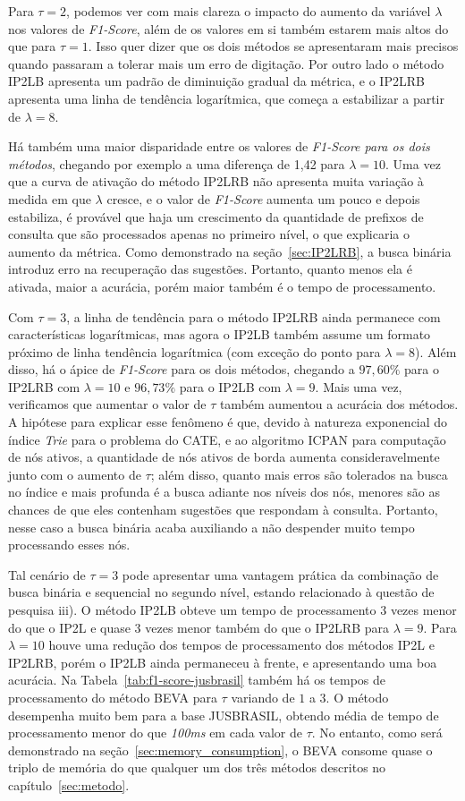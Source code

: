 Para $\tau=2$, podemos ver com mais clareza o impacto do aumento da variável $\lambda$ nos valores de \textit{F1-Score}, além de os valores em si também estarem mais altos do que para $\tau=1$. Isso quer dizer que os dois métodos se apresentaram mais precisos quando passaram a tolerar mais um erro de digitação. Por outro lado o método IP2LB apresenta um padrão de diminuição gradual da métrica, e o IP2LRB apresenta uma linha de tendência logarítmica, que começa a estabilizar a partir de $\lambda=8$.

Há também uma maior disparidade entre os valores de \textit{F1-Score para os dois métodos}, chegando por exemplo a uma diferença de 1,42 para $\lambda=10$. Uma vez que a curva de ativação do método IP2LRB não apresenta muita variação à medida em que $\lambda$ cresce, e o valor de \textit{F1-Score} aumenta um pouco e depois estabiliza, é provável que haja um crescimento da quantidade de prefixos de consulta que são processados apenas no primeiro nível, o que explicaria o aumento da métrica. Como demonstrado na seção~\ref{sec:IP2LRB}, a busca binária introduz erro na recuperação das sugestões. Portanto, quanto menos ela é ativada, maior a acurácia, porém maior também é o tempo de processamento.

Com $\tau=3$, a linha de tendência para o método IP2LRB ainda permanece com características logarítmicas, mas agora o IP2LB também assume um formato próximo de linha tendência logarítmica (com exceção do ponto para $\lambda=8$). Além disso, há o ápice de \textit{F1-Score} para os dois métodos, chegando a $97,60\%$ para o IP2LRB com $\lambda=10$ e $96,73\%$ para o IP2LB com $\lambda=9$. Mais uma vez, verificamos que aumentar o valor de $\tau$ também aumentou a acurácia dos métodos. A hipótese para explicar esse fenômeno é que, devido à natureza exponencial do índice \textit{Trie} para o problema do CATE, e ao algoritmo ICPAN para computação de nós ativos, a quantidade de nós ativos de borda aumenta consideravelmente junto com o aumento de $\tau$; além disso, quanto mais erros são tolerados na busca no índice e mais profunda é a busca adiante nos níveis dos nós, menores são as chances de que eles contenham sugestões que respondam à consulta. Portanto, nesse caso a busca binária acaba auxiliando a não despender muito tempo processando esses nós.

Tal cenário de $\tau=3$ pode apresentar uma vantagem prática da combinação de busca binária e sequencial no segundo nível, estando relacionado à questão de pesquisa iii). O método IP2LB obteve um tempo de processamento 3 vezes menor do que o IP2L e quase 3 vezes menor também do que o IP2LRB para $\lambda=9$. Para $\lambda=10$ houve uma redução dos tempos de processamento dos métodos IP2L e IP2LRB, porém o IP2LB ainda permaneceu à frente, e apresentando uma boa acurácia. Na Tabela~\ref{tab:f1-score-jusbrasil} também há os tempos de processamento do método BEVA para $\tau$ variando de $1$ a $3$. O método desempenha muito bem para a base JUSBRASIL, obtendo média de tempo de processamento menor do que \textit{100ms} em cada valor de $\tau$. No entanto, como será demonstrado na seção~\ref{sec:memory_consumption}, o BEVA consome quase o triplo de memória do que qualquer um dos três métodos descritos no capítulo~\ref{sec:metodo}. 

